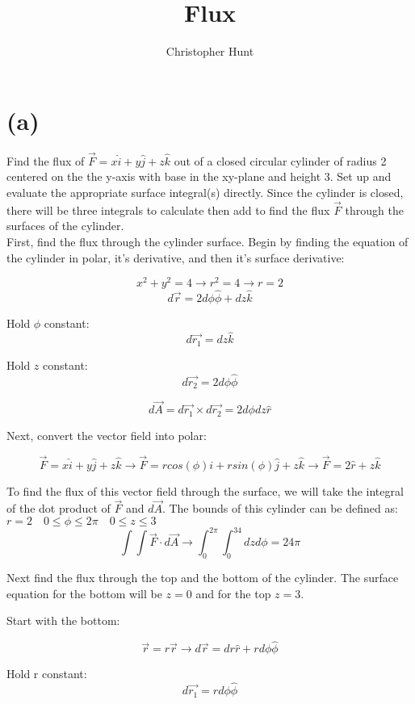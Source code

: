 \documentclass[11pt]{article}
\title{Flux}
\author{Christopher Hunt}
\date{}
\begin{document}
\pagestyle{fancy}
\fancyhf{}
\rhead{\thepage}
\maketitle

\section*{(a)}
Find the flux of $\vec{F} = x\hat{i} + y\hat{j}+ z\hat{k}$ out of a closed circular cylinder of radius 2 centered on the the y-axis with base in the xy-plane and height 3. Set up and evaluate the appropriate surface integral(s) directly. Since the cylinder is closed, there will be three integrals to calculate then add to find the flux $\vec{F}$ through the surfaces of the cylinder.
\\

First, find the flux through the cylinder surface. Begin by finding the equation of the cylinder in polar, it's derivative, and then it's surface derivative:

$$x^2+y^2=4 \rightarrow r^2=4 \rightarrow r = 2$$
$$d\vec{r}=2d\phi \hat{\phi}+dz\hat{k}$$

Hold $\phi$ constant:
$$d\vec{r_1}=dz\hat{k}$$

Hold $z$ constant:
$$d\vec{r_2}=2d\phi \hat{\phi}$$

$$d\vec{A} = d\vec{r_1} \times d\vec{r_2} = 2d\phi dz \hat{r}$$

Next, convert the vector field into polar:

$$\vec{F} = x\hat{i} + y\hat{j}+ z\hat{k} \rightarrow \vec{F} = rcos(\phi){i} + rsin(\phi)\hat{j}+ z\hat{k} \rightarrow \vec{F} = 2\hat{r}+ z\hat{k}$$

To find the flux of this vector field through the surface, we will take the integral of the dot product of $\vec{F}$ and $d\vec{A}$. The bounds of this cylinder can be defined as: $r=2\quad 0 \leq \phi \leq 2\pi \quad 0 \leq z \leq 3$
$$\int\int\vec{F} \cdot d\vec{A} \rightarrow \int_0^{2\pi}\int_0^34 dz d\phi = 24\pi$$

Next find the flux through the top and the bottom of the cylinder. The surface equation for the bottom will be $z=0$ and for the top $z=3$.

Start with the bottom:

$$\vec{r} = r\vec{r} \rightarrow d\vec{r} = dr\hat{r} + rd\phi \hat{\phi}$$

Hold r constant:
$$d\vec{r_1} = rd\phi\hat{\phi}$$
\end{document}
